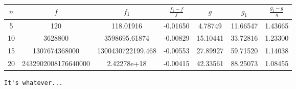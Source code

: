 \documentclass{article}
\begin{document}
  \begin{table}[h]
    \begin{tabular}{|c|c|c|c|c|c|c|}
    \hline
    $n$ & $f$ & $f_1$ & $\frac{f_1 - f}{f}$ & $g$ & $g_1$ & $\frac{g_1 -g}{g}$ \\ \hline
    5 & 120 & 118.01916 & -0.01650 & 4.78749 & 11.66547 & 1.43665 \\ \hline
    10 & 3628800 & 3598695.61874 & -0.00829 & 15.10441 & 33.72816 & 1.23300 \\ \hline
    15 & 1307674368000 & 1300430722199.468 & -0.00553 & 27.89927 & 59.71520 & 1.14038 \\ \hline
    20 & 2432902008176640000 & 2.42278e+18 & -0.00415 & 42.33561 & 88.25073 & 1.08455 \\
    \hline
    \end{tabular}
  \end{table}


  \begin{lstlisting}[mathescape=true, escapeinside=``, breakautoindent=false]
    It's whatever...
  \end{lstlisting}
\end{document}
